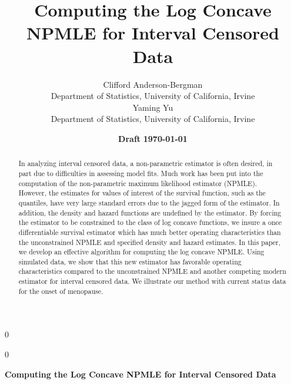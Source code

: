 \documentclass[12pt]{article}
\date{\textbf{Draft} \textbf{\today}}
\newcommand{\blind}{0}
\numberwithin{equation}{section}
\begin{document}
%


\def\spacingset#1{\renewcommand{\baselinestretch}%
{#1}\small\normalsize} \spacingset{1}



\blind
{
  \title{Computing the Log Concave NPMLE for Interval Censored Data}
  \author{Clifford Anderson-Bergman\\
    Department of Statistics, University of California, Irvine\\
      Yaming Yu\\
    Department of Statistics, University of California, Irvine\\
    }
  \maketitle
} \fi

\blind
{
  \bigskip
  \bigskip
  \bigskip
  \begin{center}
    {\LARGE\bf Computing the Log Concave NPMLE for Interval Censored Data}
\end{center}
  \medskip
} \fi


\spacingset{1.45}


\begin{abstract}

	In analyzing interval censored data, a non-parametric estimator is often desired, in part due to difficulties in assessing model fits. Much work has been put into the computation of the non-parametric maximum likelihood estimator (NPMLE). However, the estimates for values of interest of the survival function, such as the quantiles, have very large standard errors due to the jagged form of the estimator. In addition, the density and hazard functions are undefined by the estimator. By forcing the estimator to be constrained to the class of log concave functions, we insure a once differentiable survival estimator which has much better operating characteristics than the unconstrained NPMLE and specified density and hazard estimates. In this paper, we develop an effective algorithm for computing the log concave NPMLE. Using simulated data, we show that this new estimator has favorable operating characteristics compared to the unconstrained NPMLE and another competing modern estimator for interval censored data. We illustrate our method with current status data for the onset of menopause. 
\end{abstract}
\end{document}
